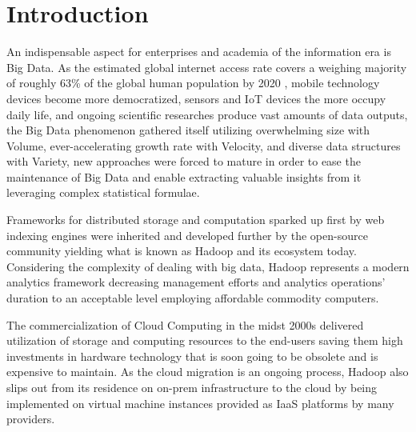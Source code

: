 \documentclass[review]{elsarticle}
\begin{document}
	\linenumbers
	
	\section{Introduction}
	
	An indispensable aspect for enterprises and academia of the information era is Big Data. As the estimated global internet access rate covers a weighing majority of roughly 63\% of the global human population by 2020 \cite{noauthor_world_nodate}, mobile technology devices become more democratized, sensors and IoT devices the more occupy daily life, and ongoing scientific researches produce vast amounts of data outputs, the Big Data phenomenon gathered itself utilizing overwhelming size with Volume, ever-accelerating growth rate with Velocity, and diverse data structures with Variety, new approaches were forced to mature in order to ease the maintenance of Big Data and enable extracting valuable insights from it leveraging complex statistical formulae.
	
	Frameworks for distributed storage and computation sparked up first by web indexing engines were inherited and developed further by the open-source community yielding what is known as Hadoop \cite{noauthor_apache_nodate} and its ecosystem today. Considering the complexity of dealing with big data, Hadoop represents a modern analytics framework decreasing management efforts and analytics operations' duration to an acceptable level employing affordable commodity computers. 
	
	The commercialization of Cloud Computing in the midst 2000s \cite{noauthor_announcing_nodate} delivered utilization of storage and computing resources to the end-users saving them high investments in hardware technology that is soon going to be obsolete and is expensive to maintain. As the cloud migration is an ongoing process, Hadoop also slips out from its residence on on-prem infrastructure to the cloud by being implemented on virtual machine instances provided as IaaS platforms by many providers. 
	
\end{document}
